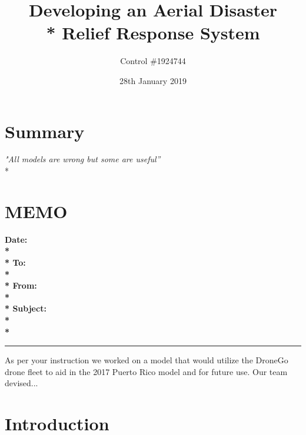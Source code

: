 \documentclass[a4paper,12pt]{article}
\begin{document}
\title{Developing an Aerial Disaster \\* Relief Response System}
\author{Control \#1924744}
\date{28th January 2019}
\maketitle
\newpage


\section*{\hfil Summary\hfil}
\begin{center}
\textit{"All models are wrong but some are useful''} \\*
\end{center}

\newpage

\section*{\hfil MEMO\hfil}
\hrulefill

\bf{Date:} \\*\\*
\bf{To:} \\*\\*
\bf{From:} \\*\\*
\bf{Subject:} \\*\\*
{\color{black}\hrule}
As per your instruction we worked on a model that would utilize the DroneGo drone fleet to aid in the 2017 Puerto Rico model and for future use.
Our team devised...

\newpage


\tableofcontents
\newpage
{}


\newpage


\section{Introduction}
\end{document}
